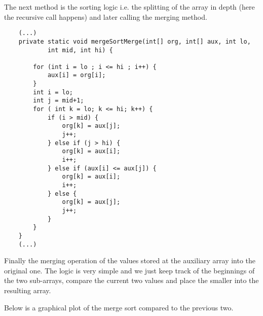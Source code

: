 \documentclass[a4paper,11pt]{article}
\begin{document}
The next method is the sorting logic i.e. the splitting of the array in depth (here the recursive call happens) and later calling the merging method.

\begin{verbatim}
    (...)
    private static void mergeSortMerge(int[] org, int[] aux, int lo, 
            int mid, int hi) {
            
        for (int i = lo ; i <= hi ; i++) {
            aux[i] = org[i];
        }
        int i = lo;
        int j = mid+1; 
        for ( int k = lo; k <= hi; k++) {
            if (i > mid) {
                org[k] = aux[j];
                j++;
            } else if (j > hi) {
                org[k] = aux[i];
                i++;
            } else if (aux[i] <= aux[j]) {
                org[k] = aux[i];
                i++;
            } else {
                org[k] = aux[j];
                j++;
            }
        }
    }
    (...)
\end{verbatim}

Finally the merging operation of the values stored at the auxiliary array into the original one. The logic is very simple and we just keep track of the beginnings of the two sub-arrays, compare the current two values and place the smaller into the resulting array.

Below is a graphical plot of the merge sort compared to the previous two.
\end{document}
